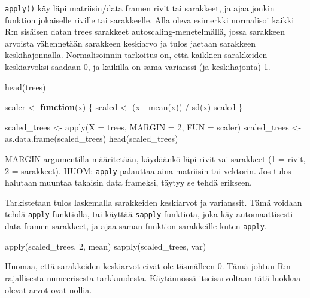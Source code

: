 \documentclass[
]{book}
\newenvironment{Shaded}{\begin{snugshade}}{\end{snugshade}}
\newcommand{\AttributeTok}[1]{\textcolor[rgb]{0.77,0.63,0.00}{#1}}
\newcommand{\ControlFlowTok}[1]{\textcolor[rgb]{0.13,0.29,0.53}{\textbf{#1}}}
\newcommand{\DecValTok}[1]{\textcolor[rgb]{0.00,0.00,0.81}{#1}}
\newcommand{\FunctionTok}[1]{\textcolor[rgb]{0.00,0.00,0.00}{#1}}
\newcommand{\NormalTok}[1]{#1}
\newcommand{\OtherTok}[1]{\textcolor[rgb]{0.56,0.35,0.01}{#1}}
\newcommand{\SpecialCharTok}[1]{\textcolor[rgb]{0.00,0.00,0.00}{#1}}
\begin{document}
\texttt{apply()} käy läpi matriisin/data framen rivit tai sarakkeet, ja ajaa jonkin funktion jokaiselle riville tai sarakkeelle. Alla oleva esimerkki normalisoi kaikki R:n sisäisen datan trees sarakkeet autoscaling-menetelmällä, jossa sarakkeen arvoista vähennetään sarakkeen keskiarvo ja tulos jaetaan sarakkeen keskihajonnalla. Normalisoinnin tarkoitus on, että kaikkien sarakkeiden keskiarvoksi saadaan 0, ja kaikilla on sama varianssi (ja keskihajonta) 1.

\begin{Shaded}
\begin{Highlighting}[]
\FunctionTok{head}\NormalTok{(trees)}

\NormalTok{scaler }\OtherTok{\textless{}{-}} \ControlFlowTok{function}\NormalTok{(x) \{}
\NormalTok{  scaled }\OtherTok{\textless{}{-}}\NormalTok{ (x }\SpecialCharTok{{-}} \FunctionTok{mean}\NormalTok{(x)) }\SpecialCharTok{/} \FunctionTok{sd}\NormalTok{(x)}
\NormalTok{  scaled}
\NormalTok{\}}

\NormalTok{scaled\_trees }\OtherTok{\textless{}{-}} \FunctionTok{apply}\NormalTok{(}\AttributeTok{X =}\NormalTok{ trees, }\AttributeTok{MARGIN =} \DecValTok{2}\NormalTok{, }\AttributeTok{FUN =}\NormalTok{ scaler)}
\NormalTok{scaled\_trees }\OtherTok{\textless{}{-}} \FunctionTok{as.data.frame}\NormalTok{(scaled\_trees)}
\FunctionTok{head}\NormalTok{(scaled\_trees)}
\end{Highlighting}
\end{Shaded}

MARGIN-argumentilla määritetään, käydäänkö läpi rivit vai sarakkeet (1 = rivit, 2 = sarakkeet). HUOM: \texttt{apply} palauttaa aina matriisin tai vektorin. Jos tulos halutaan muuntaa takaisin data frameksi, täytyy se tehdä erikseen.

Tarkistetaan tulos laskemalla sarakkeiden keskiarvot ja varianssit. Tämä voidaan tehdä \texttt{apply}-funktiolla, tai käyttää \texttt{sapply}-funktiota, joka käy automaattisesti data framen sarakkeet, ja ajaa saman funktion sarakkeille kuten \texttt{apply}.

\begin{Shaded}
\begin{Highlighting}[]
\FunctionTok{apply}\NormalTok{(scaled\_trees, }\DecValTok{2}\NormalTok{, mean)}
\FunctionTok{sapply}\NormalTok{(scaled\_trees, var)}
\end{Highlighting}
\end{Shaded}

Huomaa, että sarakkeiden keskiarvot eivät ole täsmälleen 0. Tämä johtuu R:n rajallisesta numeerisesta tarkkuudesta. Käytännössä itseisarvoltaan tätä luokkaa olevat arvot ovat nollia.
\end{document}
